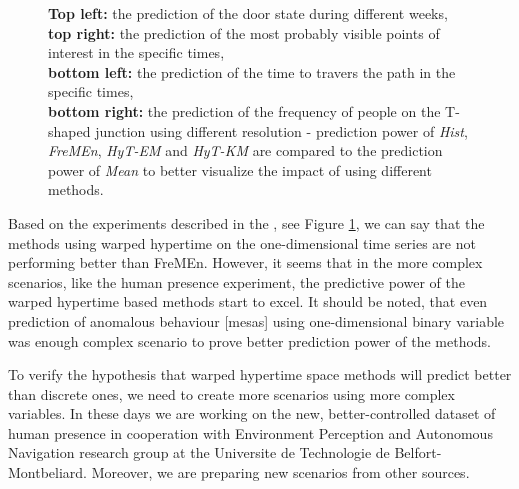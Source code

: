 \begin{figure}[!b]
\begin{center}
{\textbf{Top left:} the prediction of the door state during different weeks,\\
\textbf{top right:} the prediction of the most probably visible points of interest in the specific times,\\
\textbf{bottom left:} the prediction of the time to travers the path in the specific times,\\
\textbf{bottom right:} the prediction of the frequency of people on the T-shaped junction using different resolution - prediction power of \textit{Hist}, \textit{FreMEn}, \textit{HyT-EM} and \textit{HyT-KM} are compared to the prediction power of \textit{Mean} to better visualize the impact of using different methods.
\label{fig:complexControl}}
   \end{center}
\end{figure}

Based on the experiments described in the \cite{krajnik2018warped}, see Figure \ref{fig:complexControl}, we can say that the methods using warped hypertime on the one-dimensional time series are not performing better than FreMEn.
However, it seems that in the more complex scenarios, like the human presence experiment, the predictive power of the warped hypertime based methods start to excel.
It should be noted, that even prediction of anomalous behaviour [mesas] using one-dimensional binary variable was
enough complex scenario to prove better prediction power of the  methods.

To verify the hypothesis that warped hypertime space methods will predict better than discrete ones, we need to create more scenarios using more complex variables.
In these days we are working on the new, better-controlled dataset of human presence in cooperation with Environment Perception and Autonomous Navigation research group at the Universite de Technologie de Belfort-Montbeliard.
Moreover, we are preparing new scenarios from other sources.



